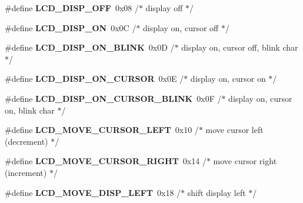 \begin{DoxyCompactItemize}
\item 
\#define {\bfseries L\+C\+D\+\_\+\+D\+I\+S\+P\+\_\+\+O\+FF}~0x08   /$\ast$ display off                            $\ast$/\hypertarget{group__pfleury__lcd_gaa2966175115943883f51e9c90478540c}{}\label{group__pfleury__lcd_gaa2966175115943883f51e9c90478540c}

\item 
\#define {\bfseries L\+C\+D\+\_\+\+D\+I\+S\+P\+\_\+\+ON}~0x0\+C   /$\ast$ display on, cursor off                 $\ast$/\hypertarget{group__pfleury__lcd_ga5163a96b133868975c0738e180b30cb8}{}\label{group__pfleury__lcd_ga5163a96b133868975c0738e180b30cb8}

\item 
\#define {\bfseries L\+C\+D\+\_\+\+D\+I\+S\+P\+\_\+\+O\+N\+\_\+\+B\+L\+I\+NK}~0x0\+D   /$\ast$ display on, cursor off, blink char     $\ast$/\hypertarget{group__pfleury__lcd_ga470cef85de53e37356b22c66a357a764}{}\label{group__pfleury__lcd_ga470cef85de53e37356b22c66a357a764}

\item 
\#define {\bfseries L\+C\+D\+\_\+\+D\+I\+S\+P\+\_\+\+O\+N\+\_\+\+C\+U\+R\+S\+OR}~0x0\+E   /$\ast$ display on, cursor on                  $\ast$/\hypertarget{group__pfleury__lcd_gaf56b6d6bdb6fa48b26106dee5f74ae1f}{}\label{group__pfleury__lcd_gaf56b6d6bdb6fa48b26106dee5f74ae1f}

\item 
\#define {\bfseries L\+C\+D\+\_\+\+D\+I\+S\+P\+\_\+\+O\+N\+\_\+\+C\+U\+R\+S\+O\+R\+\_\+\+B\+L\+I\+NK}~0x0\+F   /$\ast$ display on, cursor on, blink char      $\ast$/\hypertarget{group__pfleury__lcd_gac1984ed0db15c6991d34c184fdca5dc6}{}\label{group__pfleury__lcd_gac1984ed0db15c6991d34c184fdca5dc6}

\item 
\#define {\bfseries L\+C\+D\+\_\+\+M\+O\+V\+E\+\_\+\+C\+U\+R\+S\+O\+R\+\_\+\+L\+E\+FT}~0x10   /$\ast$ move cursor left  (decrement)          $\ast$/\hypertarget{group__pfleury__lcd_gac2f0ddce1daaa1bf1a016270a89a264b}{}\label{group__pfleury__lcd_gac2f0ddce1daaa1bf1a016270a89a264b}

\item 
\#define {\bfseries L\+C\+D\+\_\+\+M\+O\+V\+E\+\_\+\+C\+U\+R\+S\+O\+R\+\_\+\+R\+I\+G\+HT}~0x14   /$\ast$ move cursor right (increment)          $\ast$/\hypertarget{group__pfleury__lcd_ga0ad58e39e053e97d34527fcbe936899b}{}\label{group__pfleury__lcd_ga0ad58e39e053e97d34527fcbe936899b}

\item 
\#define {\bfseries L\+C\+D\+\_\+\+M\+O\+V\+E\+\_\+\+D\+I\+S\+P\+\_\+\+L\+E\+FT}~0x18   /$\ast$ shift display left                     $\ast$/\hypertarget{group__pfleury__lcd_gab3c34ff1eee238bbe9c677215219fb8e}{}\label{group__pfleury__lcd_gab3c34ff1eee238bbe9c677215219fb8e}


\end{DoxyCompactItemize}
